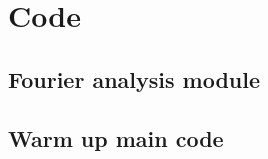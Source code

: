 \documentclass[twocolumn]{myarticle}
\begin{document}
\onecolumn

\section{Code}
\label{sec:code}

\subsection{Fourier analysis module}
\label{subsec:fourier_analysis_module}


\vspace{10pt}

\subsection{Warm up main code}
\label{subsec:warm_up_main_code}


\vspace{10pt}
\end{document}

